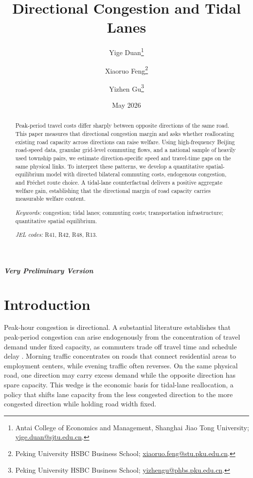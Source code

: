 \documentclass[12pt]{article}
\title{Directional Congestion and Tidal Lanes}
\author{
Yige Duan\thanks{Antai College of Economics and Management, Shanghai Jiao Tong University; \href{mailto:yige.duan@sjtu.edu.cn}{yige.duan@sjtu.edu.cn}.}
\and
Xiaoruo Feng\thanks{Peking University HSBC Business School; \href{mailto:xiaoruo.feng@stu.pku.edu.cn}{xiaoruo.feng@stu.pku.edu.cn}.}
\and
Yizhen Gu\thanks{Peking University HSBC Business School; \href{mailto:yizhengu@phbs.pku.edu.cn}{yizhengu@phbs.pku.edu.cn}.}
}
\date{May 2026}
\begin{document}
\maketitle

\begin{center}
\textbf{\textit{Very Preliminary Version}}
\end{center}

\begin{abstract}
Peak-period travel costs differ sharply between opposite directions of the same road. This paper measures that directional congestion margin and asks whether reallocating existing road capacity across directions can raise welfare. Using high-frequency Beijing road-speed data, granular grid-level commuting flows, and a national sample of heavily used township pairs, we estimate direction-specific speed and travel-time gaps on the same physical links. To interpret these patterns, we develop a quantitative spatial-equilibrium model with directed bilateral commuting costs, endogenous congestion, and Fréchet route choice. A tidal-lane counterfactual delivers a positive aggregate welfare gain, establishing that the directional margin of road capacity carries measurable welfare content.

\vspace{0.5em}

\noindent\textit{Keywords:} congestion; tidal lanes; commuting costs; transportation infrastructure; quantitative spatial equilibrium.

\vspace{0.5em}

\noindent\textit{JEL codes:} R41, R42, R48, R13.
\end{abstract}

\section{Introduction}

Peak-hour congestion is directional. A substantial literature establishes that peak-period congestion can arise endogenously from the concentration of travel demand under fixed capacity, as commuters trade off travel time and schedule delay \citep{Vickrey1969,Arnott1993}. Morning traffic concentrates on roads that connect residential areas to employment centers, while evening traffic often reverses. On the same physical road, one direction may carry excess demand while the opposite direction has spare capacity. This wedge is the economic basis for tidal-lane reallocation, a policy that shifts lane capacity from the less congested direction to the more congested direction while holding road width fixed.
\end{document}
